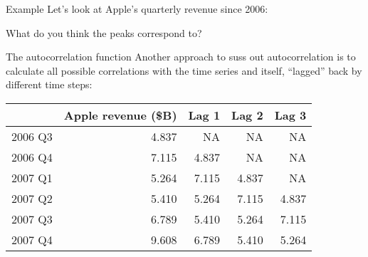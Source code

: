 \documentclass{beamer}\usepackage[]{graphicx}\usepackage[]{color}
\makeatletter
\newcommand{\hlopt}[1]{\textcolor[rgb]{1,0.894,0.769}{#1}}%
\newcommand{\hlstd}[1]{\textcolor[rgb]{1,0.894,0.769}{#1}}%
\newcommand{\hlkwd}[1]{\textcolor[rgb]{1,0.78,0.769}{#1}}%
\newenvironment{kframe}{%
 \def\at@end@of@kframe{}%
 \ifinner\ifhmode%
  \def\at@end@of@kframe{\end{minipage}}%
  \begin{minipage}{\columnwidth}%
 \fi\fi%
 \def\FrameCommand##1{\hskip\@totalleftmargin \hskip-\fboxsep
 \colorbox{shadecolor}{##1}\hskip-\fboxsep
     \hskip-\linewidth \hskip-\@totalleftmargin \hskip\columnwidth}%
 \MakeFramed {\advance\hsize-\width
   \@totalleftmargin\z@ \linewidth\hsize
   \@setminipage}}%
 {\par\unskip\endMakeFramed%
 \at@end@of@kframe}
\newenvironment{knitrout}{}{} %
\makeatother
\begin{document}
\begin{darkframes}
    \begin{frame}[fragile]{Example}
      Let's look at Apple's quarterly revenue since 2006:

\begin{knitrout}


\end{knitrout}

      What do you think the peaks correspond to?
    \end{frame}

    \begin{frame}{The autocorrelation function}
      Another approach to suss out autocorrelation is to calculate all possible correlations with the time series and itself, ``lagged'' back by different time steps:

      \bigskip

      \begin{center}
\begin{knitrout}
\begin{tabular}{lrrrr}
\toprule
  & Apple revenue (\$B) & Lag 1 & Lag 2 & Lag 3\\
\midrule
2006 Q3 & 4.837 & NA & NA & NA\\
2006 Q4 & 7.115 & 4.837 & NA & NA\\
2007 Q1 & 5.264 & 7.115 & 4.837 & NA\\
2007 Q2 & 5.410 & 5.264 & 7.115 & 4.837\\
2007 Q3 & 6.789 & 5.410 & 5.264 & 7.115\\
2007 Q4 & 9.608 & 6.789 & 5.410 & 5.264\\
\bottomrule
\end{tabular}


\end{knitrout}
      \end{center}
    \end{frame}

\end{darkframes}
\end{document}
